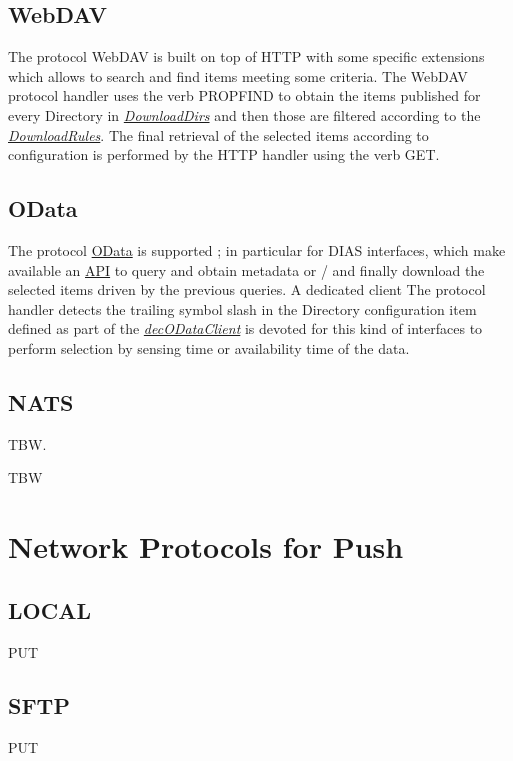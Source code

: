 \documentclass[dec_sum_main.tex]{subfiles}
\begin{document}
\subsection{WebDAV}
The protocol WebDAV is built on top of HTTP with some specific extensions which allows to search and find items meeting some criteria. The WebDAV protocol handler uses the verb PROPFIND to obtain the items published for every Directory in \hyperref[DownloadDirs]{\textit{DownloadDirs}} and then those are filtered according to the \hyperref[DownloadRules]{\textit{DownloadRules}}.
The final retrieval of the selected items according to configuration is performed by the HTTP handler using the verb GET.

\subsection{OData}
The protocol \href{https://docs.oasis-open.org/odata/odata/v4.01/odata-v4.01-part1-protocol.html}{OData} is supported ; in particular for DIAS interfaces, which make available an \href{https://scihub.copernicus.eu/userguide/ODataAPI}{API} to query and obtain metadata or / and finally download the selected items driven by the previous queries.
A dedicated client The protocol handler detects the trailing symbol slash in the Directory configuration item defined as part of the \hyperref[decODataClient]{\textit{decODataClient}} is devoted for this kind of interfaces to perform selection by sensing time or availability time of the data.

\subsection{NATS}
TBW. \newline

\par \noindent
TBW

\section{Network Protocols for Push}

\subsection{LOCAL}
PUT

\subsection{SFTP}
PUT
\end{document}
